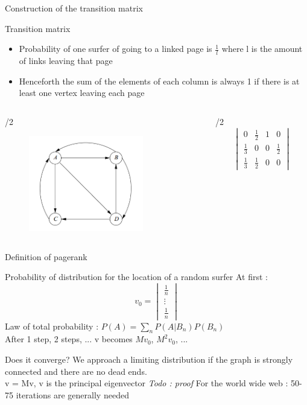 \documentclass[10pt]{beamer}
\begin{document}
\begin{frame}{Construction of the transition matrix}
  \begin{block}{Transition matrix}
    \begin{itemize}
      \item Probability of one surfer of going to a linked page is $\frac{1}{l}$ where l is the amount of links leaving that page
      \item Henceforth the sum of the elements of each column is always 1 if there is at least one vertex leaving each page
    \end{itemize}
  \end{block}
  \begin{columns}
    \begin{column}{\paperwidth/2}
      \begin{figure}
        \includegraphics[width = 5cm]{graph1.png}
      \end{figure}
    \end{column}
    \begin{column}{\paperwidth/2}
      $$\begin{vmatrix}
        0 & \frac{1}{2} & 1 & 0 \\
        \frac{1}{3} & 0 & 0 &\frac{1}{2} \\
        \frac{1}{3} & \frac{1}{2}&  0& 0

      \end{vmatrix}$$
    \end{column}
  \end{columns}
\end{frame}


\begin{frame}{Definition of pagerank}
  \begin{block}{Probability of distribution for the location of a random surfer}
    At first : $$v_0 = \begin{vmatrix}\frac{1}{n}\\
      \vdots \\
    \frac{1}{n}\end{vmatrix}$$
    Law of total probability : $P(A) = \sum_n P(A|B_n)P(B_n)$\\
    After 1 step, 2 steps, ... v becomes $Mv_0$, $M^2v_0$, ...
  \end{block}
  \begin{block}{Does it converge?}
    We approach a limiting distribution if the graph is strongly connected and there are no dead ends.\\
    v = Mv, v is the principal eigenvector \textit{Todo : proof}
    For the world wide web : 50-75 iterations are generally needed
  \end{block}
\end{frame}
\end{document}
